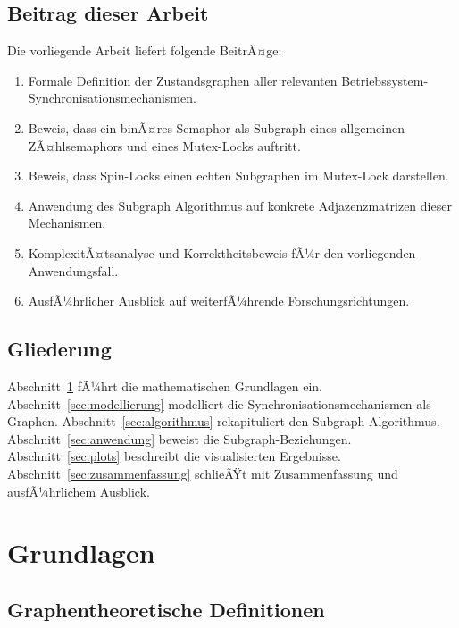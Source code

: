 ﻿\documentclass[a4paper,12pt]{article}
\theoremstyle{definition}
\begin{document}
\subsection{Beitrag dieser Arbeit}

Die vorliegende Arbeit liefert folgende BeitrÃ¤ge:

\begin{enumerate}
  \item Formale Definition der Zustandsgraphen aller relevanten
        Betriebssystem-Synchronisa\-tionsmechanismen.
  \item Beweis, dass ein binÃ¤res Semaphor als Subgraph eines allgemeinen
        ZÃ¤hlsemaphors und eines Mutex-Locks auftritt.
  \item Beweis, dass Spin-Locks einen echten Subgraphen im Mutex-Lock
        darstellen.
  \item Anwendung des Subgraph Algorithmus auf konkrete Adjazenzmatrizen
        dieser Mechanismen.
  \item KomplexitÃ¤tsanalyse und Korrektheitsbeweis fÃ¼r den vorliegenden
        Anwendungsfall.
  \item AusfÃ¼hrlicher Ausblick auf weiterfÃ¼hrende Forschungsrichtungen.
\end{enumerate}

\subsection{Gliederung}

Abschnitt~\ref{sec:grundlagen} fÃ¼hrt die mathematischen Grundlagen ein.
Abschnitt~\ref{sec:modellierung} modelliert die Synchronisations\-mechanismen
als Graphen. Abschnitt~\ref{sec:algorithmus} rekapituliert den Subgraph
Algorithmus. Abschnitt~\ref{sec:anwendung} beweist die Subgraph-Beziehungen.
Abschnitt~\ref{sec:plots} beschreibt die visualisierten Ergebnisse.
Abschnitt~\ref{sec:zusammenfassung} schlieÃŸt mit Zusammenfassung und
ausfÃ¼hrlichem Ausblick.

\section{Grundlagen}
\label{sec:grundlagen}

\subsection{Graphentheoretische Definitionen}
\end{document}
